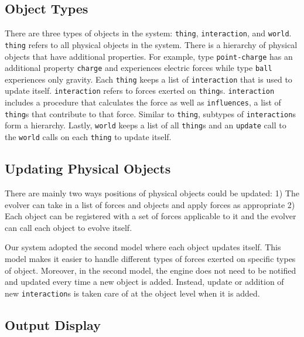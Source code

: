 \documentclass{article}
\begin{document}
\subsection{Object Types}

There are three types of objects in the system: \texttt{thing},
\texttt{interaction}, and \texttt{world}. \texttt{thing} refers to all physical
objects in the system. There is a hierarchy of physical objects that have
additional properties. For example, type \texttt{point-charge} has an
additional property \texttt{charge} and experiences electric forces while type
\texttt{ball} experiences only gravity. Each \texttt{thing} keeps a list of
\texttt{interaction} that is used to update itself. \texttt{interaction} refers
to forces exerted on \texttt{thing}s. \texttt{interaction} includes a procedure
that calculates the force as well as \texttt{influences}, a list of
\texttt{thing}s that contribute to that force. Similar to \texttt{thing},
subtypes of \texttt{interaction}s form a hierarchy. Lastly, \texttt{world}
keeps a list of all \texttt{thing}s and an \texttt{update} call to the
\texttt{world} calls on each \texttt{thing} to update itself.


\subsection{Updating Physical Objects}

There are mainly two ways positions of physical objects could be updated: 1)
The evolver can take in a list of forces and objects and apply forces as
appropriate 2) Each object can be registered with a set of forces applicable to
it and the evolver can call each object to evolve itself.

Our system adopted the second model where each object updates itself. This
model makes it easier to handle different types of forces exerted on specific
types of object. Moreover, in the second model, the engine does not need to be
notified and updated every time a new object is added. Instead, update or
addition of new \texttt{interaction}s is taken care of at the object level when
it is added.


\subsection{Output Display}
\end{document}
